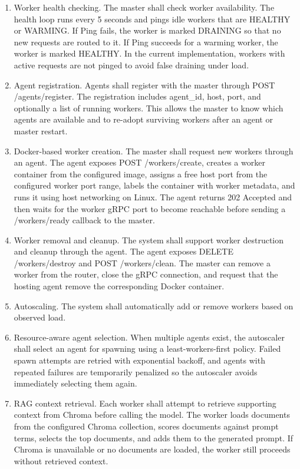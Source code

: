 \begin{enumerate}[label=FR-\arabic*., leftmargin=1.8em]
  \item Worker health checking. The master shall check worker availability. The health loop runs every 5 seconds and pings idle workers that are HEALTHY or WARMING. If Ping fails, the worker is marked DRAINING so that no new requests are routed to it. If Ping succeeds for a warming worker, the worker is marked HEALTHY. In the current implementation, workers with active requests are not pinged to avoid false draining under load.
  \item Agent registration. Agents shall register with the master through POST /agents/register. The registration includes agent_id, host, port, and optionally a list of running workers. This allows the master to know which agents are available and to re-adopt surviving workers after an agent or master restart.
  \item Docker-based worker creation. The master shall request new workers through an agent. The agent exposes POST /workers/create, creates a worker container from the configured image, assigns a free host port from the configured worker port range, labels the container with worker metadata, and runs it using host networking on Linux. The agent returns 202 Accepted and then waits for the worker gRPC port to become reachable before sending a /workers/ready callback to the master.
  \item Worker removal and cleanup. The system shall support worker destruction and cleanup through the agent. The agent exposes DELETE /workers/destroy and POST /workers/clean. The master can remove a worker from the router, close the gRPC connection, and request that the hosting agent remove the corresponding Docker container.
  \item Autoscaling. The system shall automatically add or remove workers based on observed load.
  \item Resource-aware agent selection. When multiple agents exist, the autoscaler shall select an agent for spawning using a least-workers-first policy. Failed spawn attempts are retried with exponential backoff, and agents with repeated failures are temporarily penalized so the autoscaler avoids immediately selecting them again.
  \item RAG context retrieval. Each worker shall attempt to retrieve supporting context from Chroma before calling the model. The worker loads documents from the configured Chroma collection, scores documents against prompt terms, selects the top documents, and adds them to the generated prompt. If Chroma is unavailable or no documents are loaded, the worker still proceeds without retrieved context.

\end{enumerate}
